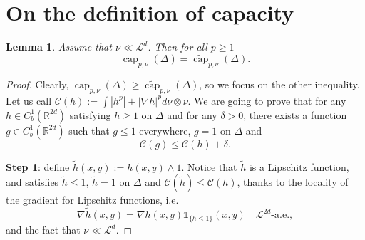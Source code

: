 \documentclass[10pt,leqno]{amsart}
\numberwithin{equation}{section}
\newtheorem{lemma}[teorema]{Lemma}
\newcommand{\R}{\mathbb{R}}
\begin{document}
\printbibliography

\appendix

\section{On the definition of capacity}\label{app: capacity}
\begin{lemma}\label{lemma: capacity appendix}
    Assume that $\nu \ll \mathcal{L}^d$. Then for all $p\geq 1$
    \[\operatorname{cap}_{p,\nu}(\Delta) = \widetilde{\operatorname{cap}}_{p,\nu}(\Delta).\]
\end{lemma}

\begin{proof}
Clearly, $\operatorname{cap}_{p,\nu}(\Delta) \geq \widetilde{\operatorname{cap}}_{p,\nu}(\Delta)$, so we focus on the other inequality.
    Let us call $\mathcal{C}(h) := \int |h^p| + |\nabla h|^p d\nu\otimes \nu$. We are going to prove that for any $h\in C_b^1(\R^{2d})$ satisfying $h\geq 1$ on $\Delta$ and for any $\delta>0$, there exists a function $g\in C_b^1(\R^{2d})$ such that $g\leq 1$ everywhere, $g=1$ on $\Delta$ and 
    \begin{equation}\label{eq: proof of cap lemma}
       \mathcal{C}(g) \leq \mathcal{C}(h) + \delta.
    \end{equation}

    \textbf{Step 1}: define $\tilde{h}(x,y) := h(x,y)\wedge 1$. Notice that $\tilde{h}$ is a Lipschitz function, and satisfies $\tilde{h}\leq 1$, $\tilde{h} = 1$ on $\Delta$ and $\mathcal{C}(\tilde{h})\leq \mathcal{C}(h)$, thanks to the locality of the gradient for Lipschitz functions, i.e. 
    \begin{equation}\label{eq: gradient of truncated h}
    \nabla \tilde{h}(x,y) = \nabla h(x,y) \mathds{1}_{\{h\leq 1\}}(x,y) \quad \mathcal{L}^{2d}\text{-a.e.},
    \end{equation}
    and the fact that $\nu \ll \mathcal{L}^d$.


\end{proof}
\end{document}
